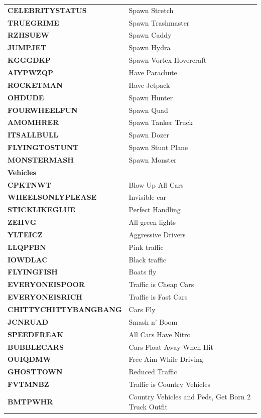 \documentclass{article}
\begin{document}
\begin{small}
\begin{longtable}{|l l|}
	\textbf{CELEBRITYSTATUS }& Spawn Stretch \\
	\textbf{TRUEGRIME }& Spawn Trashmaster \\
	\textbf{RZHSUEW }& Spawn Caddy \\
	\textbf{JUMPJET }& Spawn Hydra \\
	\textbf{KGGGDKP }& Spawn Vortex Hovercraft \\
	\textbf{AIYPWZQP }& Have Parachute \\
	\textbf{ROCKETMAN }& Have Jetpack \\
	\textbf{OHDUDE }& Spawn Hunter \\
	\textbf{FOURWHEELFUN }& Spawn Quad \\
	\textbf{AMOMHRER }& Spawn Tanker Truck \\
	\textbf{ITSALLBULL }& Spawn Dozer \\
	\textbf{FLYINGTOSTUNT }& Spawn Stunt Plane \\
	\textbf{MONSTERMASH }& Spawn Monster \\
	\hline
	\hline
	\textbf{Vehicles}& \\
	\hline
	\textbf{CPKTNWT }& Blow Up All Cars \\
	\textbf{WHEELSONLYPLEASE }& Invisible car \\
	\textbf{STICKLIKEGLUE }& Perfect Handling \\
	\textbf{ZEIIVG }& All green lights \\
	\textbf{YLTEICZ }& Aggressive Drivers \\
	\textbf{LLQPFBN }& Pink traffic \\
	\textbf{IOWDLAC }& Black traffic \\
	\textbf{FLYINGFISH }& Boats fly \\
	\textbf{EVERYONEISPOOR }& Traffic is Cheap Cars \\
	\textbf{EVERYONEISRICH }& Traffic is Fast Cars \\
	\textbf{CHITTYCHITTYBANGBANG }& Cars Fly \\
	\textbf{JCNRUAD }& Smash n' Boom \\
	\textbf{SPEEDFREAK }& All Cars Have Nitro \\
	\textbf{BUBBLECARS }& Cars Float Away When Hit \\
	\textbf{OUIQDMW }& Free Aim While Driving \\
	\textbf{GHOSTTOWN }& Reduced Traffic \\
	\textbf{FVTMNBZ }& Traffic is Country Vehicles \\
	\textbf{BMTPWHR }& Country Vehicles and Peds, Get Born 2 Truck Outfit \\

\end{longtable}
\end{small}
\end{document}
